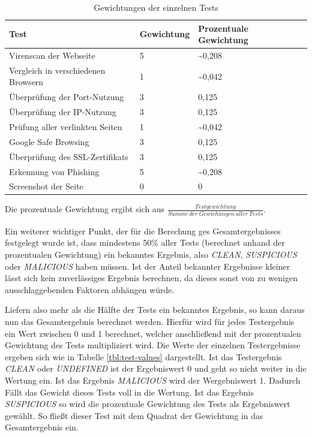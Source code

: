 \begin{table}[H]
\centering
\begin{tabular}{|l|l|l|l|}
\hline
\textbf{Test} & \textbf{Gewichtung} & \textbf{Prozentuale Gewichtung} \\\hline
Virenscan der Webseite & 5 & \textasciitilde0,208\\\hline
Vergleich in verschiedenen Browsern & 1 & \textasciitilde0,042\\\hline
Überprüfung der Port-Nutzung & 3 & 0,125\\\hline
Überprüfung der IP-Nutzung & 3 & 0,125\\\hline
Prüfung aller verlinkten Seiten & 1 & \textasciitilde0,042\\\hline
Google Safe Browsing & 3 & 0,125\\\hline
Überprüfung des SSL-Zertifikats & 3 & 0,125\\\hline
Erkennung von Phishing & 5 & \textasciitilde0,208\\\hline
Screenshot der Seite & 0 & 0\\\hline
\end{tabular}
\caption{Gewichtungen der einzelnen Tests}
\label{tbl:test-weights}
\end{table}

Die prozentuale Gewichtung ergibt sich aus $\frac{Testgewichtung}{Summe~der~Gewichungen~aller~Tests}$.

Ein weiterer wichtiger Punkt, der für die Berechung ges Gesamtergebnisses festgelegt wurde ist, dass mindestens 50\% aller Tests (berechnet anhand der prozentualen Gewichtung) ein bekanntes Ergebnis, also \textit{CLEAN}, \textit{SUSPICIOUS} oder \textit{MALICIOUS} haben müssen. Ist der Anteil bekannter Ergebnisse kleiner lässt sich kein zuverlässiges Ergebnis berechnen, da dieses sonst von zu wenigen ausschlaggebenden Faktoren abhängen würde.

Liefern also mehr als die Hälfte der Tests ein bekanntes Ergebnis, so kann daraus nun das Gesamtergebnis berechnet werden. Hierfür wird für jedes Testergebnis ein Wert zwischen 0 und 1 berechnet, welcher anschließend mit der prozentualen Gewichtung des Tests multipliziert wird. Die Werte der einzelnen Testergebnisse ergeben sich wie in Tabelle \ref{tbl:test-values} dargestellt. Ist das Testergebnis \textit{CLEAN} oder \textit{UNDEFINED} ist der Ergebniswert 0 und geht so nicht weiter in die Wertung ein. Ist das Ergebnis \textit{MALICIOUS} wird der Wergebniswert 1. Dadurch Fällt das Gewicht dieses Tests voll in die Wertung. Ist das Ergebnis \textit{SUSPICIOUS} so wird die prozentuale Gewichtung des Tests als Ergebniswert gewählt. So fließt dieser Test mit dem Quadrat der Gewichtung in das Gesamtergebnis ein.


